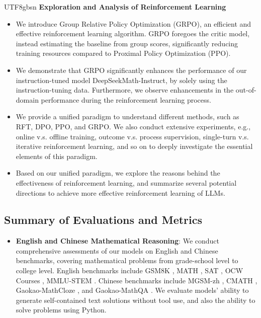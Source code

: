 \documentclass[11pt, a4paper, logo, copyright, nonumbering]{deepseek}
\begin{document}
\begin{CJK*}{UTF8}{gbsn}
\noindent
\textbf{Exploration and Analysis of Reinforcement Learning}
\begin{itemize}[topsep=0pt]
    \item We introduce Group Relative Policy Optimization (GRPO), an efficient and effective reinforcement learning algorithm. GRPO foregoes the critic model, instead estimating the baseline from group scores, significantly reducing training resources compared to Proximal Policy Optimization (PPO).
    \item We demonstrate that GRPO significantly enhances the performance of our instruction-tuned model DeepSeekMath-Instruct, by solely using the instruction-tuning data. 
    Furthermore, we observe enhancements in the out-of-domain performance during the reinforcement learning process.
    \item We provide a unified paradigm to understand different methods, such as RFT, DPO, PPO, and GRPO. We also conduct extensive experiments, e.g., online v.s. offline training, outcome v.s. process supervision, single-turn v.s. iterative reinforcement learning, and so on to deeply investigate the essential elements of this paradigm.
    \item Based on our unified paradigm, we explore the reasons behind the effectiveness of reinforcement learning, and summarize several potential directions to achieve more effective reinforcement learning of LLMs.
\end{itemize}

\subsection{Summary of Evaluations and Metrics}
\begin{itemize}[topsep=0pt]
    \item \textbf{English and Chinese Mathematical Reasoning}:
    We conduct comprehensive assessments of our models on English and Chinese benchmarks, covering mathematical problems from grade-school level to college level.
    English benchmarks include GSM8K \citep{gsm8k}, MATH \citep{MATH}, SAT \citep{llemma}, OCW Courses \citep{minerva}, MMLU-STEM \citep{mmlu}.
    Chinese benchmarks include MGSM-zh \citep{mgsm}, CMATH \citep{wei2023cmath}, Gaokao-MathCloze \citep{agieval}, and Gaokao-MathQA \citep{agieval}.
    We evaluate models' ability to generate self-contained text solutions without tool use, and also the ability to solve problems using Python.
    

\end{itemize}
\end{CJK*}
\end{document}
